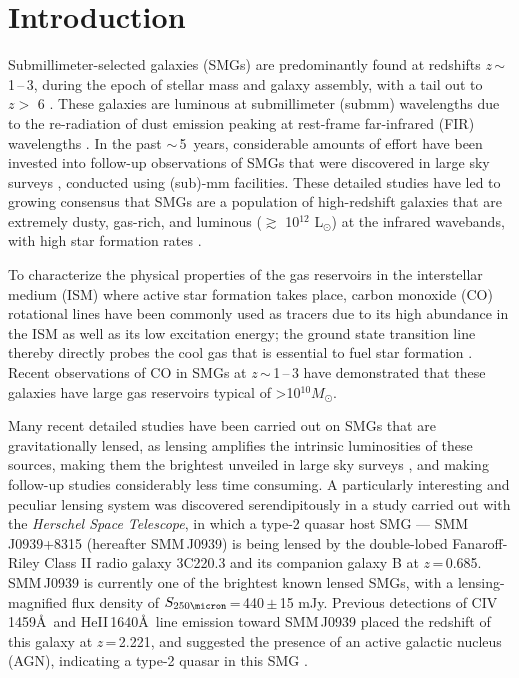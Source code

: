 \documentclass[twocolumn,apj,numberedappendix]{emulateapj}
\newcommand{\Msun}{\mbox{$M_{\odot}$}}
\newcommand{\Lsun}{\mbox{L$_{\odot}$}}
\newcommand{\eg}{{\sl e.g.,~}}
\newcommand{\pmOne}{\mbox{$^{-1}$}}
\begin{document}
\section{Introduction}\label{sec:intro}
Submillimeter-selected galaxies (SMGs) are predominantly found at redshifts $z$\,$\sim$\,1\,--\,3, during the epoch of stellar mass and
galaxy assembly, with a tail out to $z>$ 6 \citep{Riechers13a}.
These galaxies are luminous at submillimeter (submm) wavelengths due to the re-radiation of dust emission peaking at
rest-frame far-infrared (FIR) wavelengths \citep{blain02a}.
In the past $\sim$\,5~years, considerable amounts of effort have been invested into follow-up observations of SMGs that were
discovered in large sky surveys \citep[\eg H-ATLAS, HerMES, SPT; ][]{Eales10a,Oliver12a,Vieira10a}, conducted using (sub)-mm facilities. These detailed studies have led to growing consensus that SMGs are a population of high-redshift galaxies that are extremely dusty, gas-rich,
  and luminous ($\gtrsim$ 10$^{12}$ \Lsun) at the infrared wavebands, with high star formation rates \citep[$\gtrsim $ 500 \Msun yr\pmOne; \eg][]{Lagache05a,Casey14a}.

  To characterize the physical properties of the gas reservoirs in the interstellar medium (ISM) where active star formation takes place, carbon monoxide (CO) rotational lines have been commonly used as tracers due to its high abundance in the ISM as well as its low excitation energy; the ground state transition line thereby directly probes the cool gas that is essential to fuel star formation \citep[See \eg][]{Solomon05a,Carilli13a}. Recent observations of CO in SMGs at $z$\,$\sim$\,1\,--\,3 have demonstrated that these galaxies have large gas reservoirs typical of \textgreater 10$^{10}$\Msun \citep[\eg][]{Riechers11c,Riechers11d,Ivison11a,Bothwell13a}.

Many recent detailed studies have been carried out on SMGs that are gravitationally lensed,
 as lensing amplifies the intrinsic luminosities of these sources, making them the brightest unveiled in large sky surveys \citep{Negrello10a,Vieira10a,Oliver12a}, and making follow-up studies considerably less time consuming.
A particularly interesting and peculiar lensing system was discovered serendipitously in a study carried out with the {\it Herschel Space Telescope}, in which
a type-2 quasar host SMG --- SMM\,J0939+8315 (hereafter SMM\,J0939) is being lensed by the double-lobed Fanaroff-Riley
Class II \citep*[FR-II; ][]{Fanaroff74} radio galaxy 3C220.3 and its
companion galaxy B at $z$\,=\,0.685.
SMM\,J0939 is currently one of the brightest known lensed
SMGs, with a lensing-magnified flux density of $S_\textrm{250\micron}$\,=\,440\,$\pm$\,15 mJy.
Previous detections of C{\scriptsize\sc IV}\,1459\AA\
 and He{\scriptsize\sc II}\,1640\AA\ line emission toward SMM\,J0939
 placed the redshift of this galaxy at $z$\,=\,2.221, and suggested the presence of an active galactic nucleus (AGN),
indicating a type-2 quasar in this SMG \citep[hereafter H14]{Haas14}.
\end{document}
